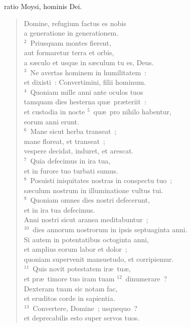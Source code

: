 \bchapter
{}ratio Moysi, hominis Dei. \begin{flushleft}\begin{verse}\vspace{6pt}Domine, refugium factus es nobis\\ a generatione in generationem.\\
${}^{2}$~Priusquam montes fierent,\\ aut formaretur terra et orbis,\\ a s\ae culo et usque in s\ae culum tu es, Deus.\\
${}^{3}$~Ne avertas hominem in humilitatem~:\\ et dixisti~: Convertimini, filii hominum.\\
${}^{4}$~Quoniam mille anni ante oculos tuos\\ tamquam dies hesterna qu\ae\ pr\ae teriit~:\\ et custodia in nocte
${}^{5}$~qu\ae\ pro nihilo habentur,\\ eorum anni erunt.\\
${}^{6}$~Mane sicut herba transeat~;\\ mane floreat, et transeat~;\\ vespere decidat, induret, et arescat.\\
${}^{7}$~Quia defecimus in ira tua,\\ et in furore tuo turbati sumus.\\
${}^{8}$~Posuisti iniquitates nostras in conspectu tuo~;\\ s\ae culum nostrum in illuminatione vultus tui.\\
${}^{9}$~Quoniam omnes dies nostri defecerunt,\\ et in ira tua defecimus.\\ Anni nostri sicut aranea meditabuntur~;\\
${}^{10}$~dies annorum nostrorum in ipsis septuaginta anni.\\ Si autem in potentatibus octoginta anni,\\ et amplius eorum labor et dolor~;\\ quoniam supervenit mansuetudo, et corripiemur.\\
${}^{11}$~Quis novit potestatem ir\ae\ tu\ae ,\\ et pr\ae\ timore tuo iram tuam
${}^{12}$~dinumerare~?\\ Dexteram tuam sic notam fac,\\ et eruditos corde in sapientia.\\
${}^{13}$~Convertere, Domine~; usquequo~?\\ et deprecabilis esto super servos tuos.\\

\end{verse}
\end{flushleft}

